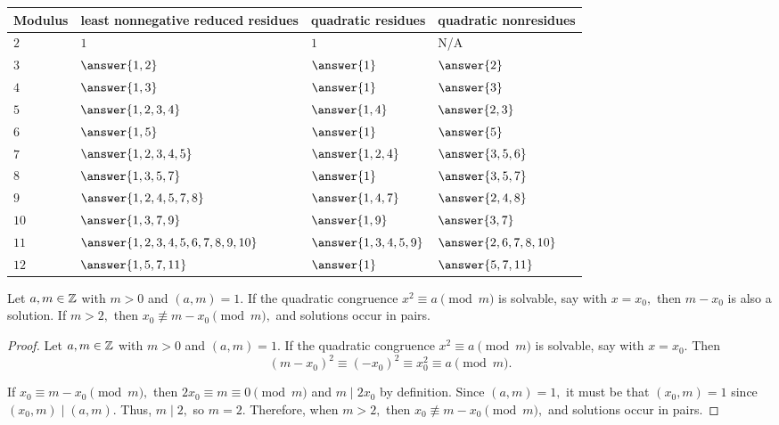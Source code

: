 \documentclass[letterpaper, 11 pt]{ximera}
\begin{document}
\begin{br}
\begin{solution}
        \begin{tabular}{p{1.5cm}|p{4cm}p{3cm}p{3cm}}
            Modulus & least nonnegative reduced residues & quadratic residues & quadratic nonresidues \\\hline
            $2$ & $1$   
                & $1$ 
                & N/A \\
            $3$ & $\answer{1,2}$ 
                & $\answer{1}$
                & $\answer{2}$\\
            $4$ & $\answer{1,3}$ 
                & $\answer{1}$
                & $\answer{3}$\\
            $5$ & $\answer{1,2,3,4}$
                & $\answer{1,4}$
                & $\answer{2,3}$\\
            $6$ & $\answer{1,5}$
                & $\answer{1}$
                & $\answer{5}$\\
            $7$ & $\answer{1,2,3,4,5}$
                & $\answer{1,2,4}$
                & $\answer{3,5,6}$\\
            $8$ & $\answer{1,3,5,7}$
                & $\answer{1}$
                & $\answer{3,5,7}$\\
            $9$ & $\answer{1,2,4,5,7,8}$
                & $\answer{1,4,7}$
                & $\answer{2,4,8}$\\
            $10$ & $\answer{1,3,7,9}$
                & $\answer{1,9}$
                & $\answer{3,7}$\\
            $11$ & $\answer{1,2,3,4,5,6,7,8,9,10}$
                & $\answer{1,3,4,5,9}$
                & $\answer{2,6,7,8,10}$\\
            $12$ & $\answer{1,5,7,11}$
                & $\answer{1}$
                & $\answer{5,7,11}$\\
        \end{tabular}
    \end{solution}
\end{br}

\begin{lem*}\label{lem:roots-pairs}
    Let $a,m\in\mathbb Z$ with $m>0$ and $(a,m)=1.$ If the quadratic congruence $x^2\equiv a\pmod{m}$ is solvable, say with $x=x_0,$ then  $m-x_0$ is also a solution. If $m\gt 2,$ then $x_0\not\equiv m-x_0\pmod{m},$ and solutions occur in pairs.
\end{lem*}

\begin{proof}
    Let $a,m\in\mathbb Z$ with $m>0$ and $(a,m)=1.$ If the quadratic congruence $x^2\equiv a\pmod{m}$ is solvable, say with $x=x_0.$ Then 
    \[(m-x_0)^2\equiv (-x_0)^2\equiv x_0^2\equiv a\pmod{m}.\]
    
    If $x_0\equiv m-x_0\pmod{m},$ then $2x_0\equiv m\equiv 0 \pmod{m}$ and $m\mid 2x_0$ by definition. Since $(a,m)=1,$ it must be that $(x_0,m)=1$ since $(x_0,m)\mid(a,m).$ Thus, $m\mid 2,$ so $m=2.$ Therefore, when  $m\gt 2,$ then $x_0\not\equiv m-x_0\pmod{m},$ and solutions occur in pairs.
\end{proof}
\end{document}
